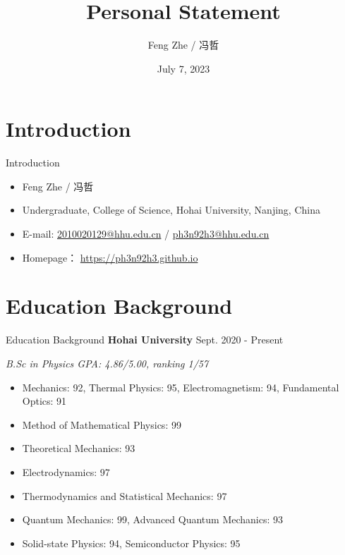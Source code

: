 \documentclass[9pt,aspectratio=169,hyperref=colorlinks]{beamer}
\title{Personal Statement}
\institute{College of Science, Hohai University}
\author{Feng Zhe / 冯哲}
\date{July 7, 2023}
\begin{document}
\frame{\titlepage}

\section{Introduction}
\begin{frame}{Introduction}
    \begin{itemize}
        \item Feng Zhe / 冯哲
        \item Undergraduate, College of Science, Hohai University, Nanjing, China
        \item E-mail: \href{mailto:2010020129@hhu.edu.cn}{2010020129@hhu.edu.cn} / \href{mailto:ph3n92h3@hhu.edu.cn}{ph3n92h3@hhu.edu.cn}
        \item Homepage： \href{https://ph3n92h3.github.io}{https://ph3n92h3.github.io}
    \end{itemize}
\end{frame}

\section{Education Background}
\begin{frame}{Education Background}
    \textbf{Hohai University} \hfill Sept. 2020 - Present

    \textit{B.Sc in Physics \hfill GPA: 4.86/5.00, ranking 1/57}

    \begin{itemize}
        \item Mechanics: 92, Thermal Physics: 95, Electromagnetism: 94, Fundamental Optics: 91
        \item Method of Mathematical Physics: 99
        \item Theoretical Mechanics: 93
        \item Electrodynamics: 97
        \item Thermodynamics and Statistical Mechanics: 97
        \item Quantum Mechanics: 99, Advanced Quantum Mechanics: 93
        \item Solid-state Physics: 94, Semiconductor Physics: 95
    \end{itemize}
\end{frame}
\end{document}

